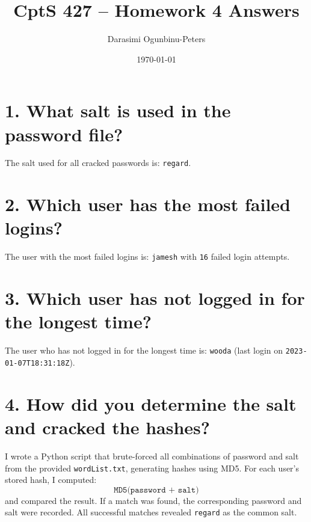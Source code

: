 \documentclass{article}
\begin{document}
\title{CptS 427 – Homework 4 Answers}
\author{Darasimi Ogunbinu-Peters}
\date{\today}
\maketitle

\section*{1. What salt is used in the password file?}
The salt used for all cracked passwords is: \texttt{regard}.

\section*{2. Which user has the most failed logins?}
The user with the most failed logins is: \texttt{jamesh} with \texttt{16} failed login attempts.

\section*{3. Which user has not logged in for the longest time?}
The user who has not logged in for the longest time is: \texttt{wooda} (last login on \texttt{2023-01-07T18:31:18Z}).

\section*{4. How did you determine the salt and cracked the hashes?}
I wrote a Python script that brute-forced all combinations of password and salt from the provided \texttt{wordList.txt}, generating hashes using MD5. For each user’s stored hash, I computed:
\[
\texttt{MD5(password + salt)}
\]
and compared the result. If a match was found, the corresponding password and salt were recorded. All successful matches revealed \texttt{regard} as the common salt.
\end{document}
